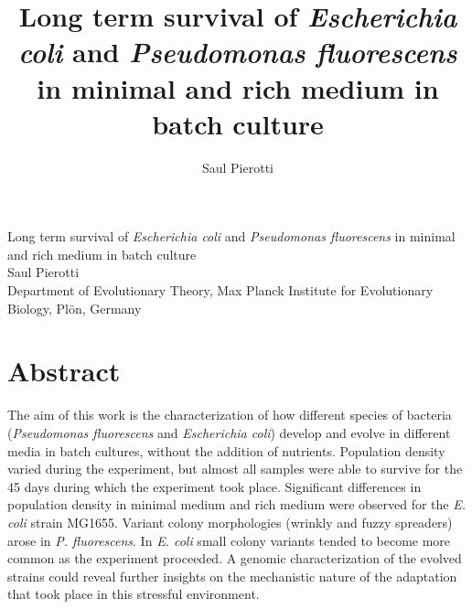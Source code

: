 \documentclass[
    11pt,
    a4paper,
    twoside
]{article} %
\author{Saul Pierotti}
\title{Long term survival of \textit{Escherichia coli} and \textit{Pseudomonas fluorescens} in minimal and rich medium in batch culture}
\begin{document}
\pagestyle{fancy}
\fancyhf{}
\fancyfoot[LE,RO]{\thepage}

\thispagestyle{noheader}
\huge
Long term survival of \textit{Escherichia coli} and \textit{Pseudomonas fluorescens} in minimal and rich medium in batch culture\\
[2 ex]
\large
Saul Pierotti\\
[1 ex]
\footnotesize
Department of Evolutionary Theory, Max Planck Institute for Evolutionary Biology, Pl{\"o}n, Germany
\normalsize

\section*{Abstract}
\begin{bfseries}
The aim of this work is the characterization of how different species of bacteria (\textit{Pseudomonas fluorescens} and \textit{Escherichia coli}) develop and evolve in different media in batch cultures, without the addition of nutrients.
Population density varied during the experiment, but almost all samples were able to survive for the 45 days during which the experiment took place.
Significant differences in population density in minimal medium and rich medium were observed for the \textit{E. coli} strain MG1655.
Variant colony morphologies (wrinkly and fuzzy spreaders) arose in \textit{P. fluorescens}.
In \textit{E. coli} small colony variants tended to become more common as the experiment proceeded.
A genomic characterization of the evolved strains could reveal further insights on the mechanistic nature of the adaptation that took place in this stressful environment.
\end{bfseries}
\\[5ex]
\end{document}
